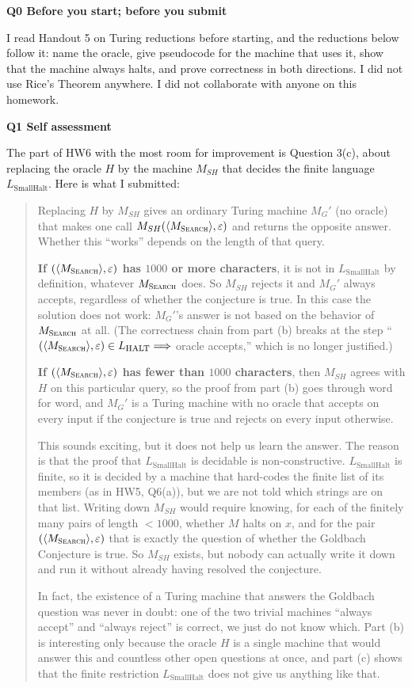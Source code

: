 \documentclass[11pt]{article}
\newcommand{\inner}[1]{\langle #1 \rangle}
\newcommand{\Lh}{L_{\text{HALT}}}
\newcommand{\Lsmh}{L_{\text{SmallHalt}}}
\newcommand{\Ms}{M_{\textsc{Search}}}
\newcommand{\qpage}[1]{\clearpage\noindent\textbf{\large #1}\par\medskip}
\begin{document}
\noindent\textbf{\large Q0 Before you start; before you submit}\par\medskip

I read Handout 5 on Turing reductions before starting, and the reductions below follow it: name the oracle, give pseudocode for the machine that uses it, show that the machine always halts, and prove correctness in both directions.
I did not use Rice's Theorem anywhere.
I did not collaborate with anyone on this homework.

\qpage{Q1 Self assessment}

The part of HW6 with the most room for improvement is Question 3(c), about replacing the oracle $H$ by the machine $M_{SH}$ that decides the finite language $\Lsmh$.
Here is what I submitted:

\begin{quote}\small
Replacing $H$ by $M_{SH}$ gives an ordinary Turing machine $M_G'$ (no oracle) that makes one call $M_{SH}(\inner{\Ms}, \varepsilon)$ and returns the opposite answer.
Whether this ``works'' depends on the length of that query.

\textbf{If $(\inner{\Ms}, \varepsilon)$ has $1000$ or more characters}, it is not in $\Lsmh$ by definition, whatever $\Ms$ does.
So $M_{SH}$ rejects it and $M_G'$ always accepts, regardless of whether the conjecture is true.
In this case the solution does not work: $M_G'$'s answer is not based on the behavior of $\Ms$ at all.
(The correctness chain from part (b) breaks at the step ``$(\inner{\Ms}, \varepsilon) \in \Lh \Longrightarrow$ oracle accepts,'' which is no longer justified.)

\textbf{If $(\inner{\Ms}, \varepsilon)$ has fewer than $1000$ characters}, then $M_{SH}$ agrees with $H$ on this particular query, so the proof from part (b) goes through word for word, and $M_G'$ is a Turing machine with no oracle that accepts on every input if the conjecture is true and rejects on every input otherwise.

This sounds exciting, but it does not help us learn the answer.
The reason is that the proof that $\Lsmh$ is decidable is non-constructive.
$\Lsmh$ is finite, so it is decided by a machine that hard-codes the finite list of its members (as in HW5, Q6(a)), but we are not told which strings are on that list.
Writing down $M_{SH}$ would require knowing, for each of the finitely many pairs of length $< 1000$, whether $M$ halts on $x$, and for the pair $(\inner{\Ms}, \varepsilon)$ that is exactly the question of whether the Goldbach Conjecture is true.
So $M_{SH}$ exists, but nobody can actually write it down and run it without already having resolved the conjecture.

In fact, the existence of a Turing machine that answers the Goldbach question was never in doubt: one of the two trivial machines ``always accept'' and ``always reject'' is correct, we just do not know which.
Part (b) is interesting only because the oracle $H$ is a single machine that would answer this and countless other open questions at once, and part (c) shows that the finite restriction $\Lsmh$ does not give us anything like that.
\end{quote}
\end{document}
